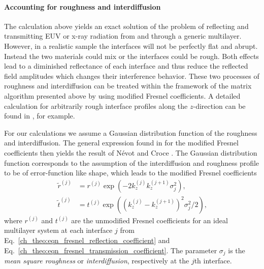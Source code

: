 \paragraph{Accounting for roughness and interdiffusion}
The calculation above yields an exact solution of the problem of reflecting and transmitting EUV or x-ray radiation from and through a generic multilayer. However, in a realistic sample the interfaces will not be perfectly flat and abrupt. Instead the two materials could mix or the interfaces could be rough. Both effects lead to a diminished reflectance of each interface and thus reduce the reflected field amplitudes which changes their interference behavior. These two processes of roughness and interdiffusion can be treated within the framework of the matrix algorithm presented above by using modified Fresnel coefficients. A detailed calculation for arbitrarily rough interface profiles along the $z$-direction can be found in \cite{vidal_metallic_1984}, for example.

For our calculations we assume a Gaussian distribution function of the roughness and interdiffusion. The general expression found in \cite{vidal_metallic_1984} for the modified Fresnel coefficients then yields the result of N\'{e}vot and Croce \cite{croce_p._etude_1976, nevot_l._caracterisation_1980}. The Gaussian distribution function corresponds to the assumption of the interdiffusion and roughness profile to be of error-function like shape, which leads to the modified Fresnel coefficients
\begin{align}
       \tilde{r}^{(j)} &= r^{(j)} \exp(-2 k_z^{(j)} k_z^{(j+1)} 
\sigma_j^2)\text{,} \nonumber \\
       \tilde{t}^{(j)} &= t^{(j)} \exp((k_z^{(j)} - k_z^{(j+1)})^2 \sigma_j^2/2) 
\text{,} \label{eqn:mod_fresnel}
\end{align}
where $r^{(j)}$ and $t^{(j)}$ are the unmodified Fresnel coefficients for an ideal multilayer system at each interface $j$ from Eq.~\eqref{ch_theo:eqn_fresnel_reflection_coefficient} and Eq.~\eqref{ch_theo:eqn_fresnel_transmission_coefficient}. The parameter $\sigma_j$ is the \emph{mean square roughness} or \emph{interdiffusion}, respectively at the $j$th interface.



